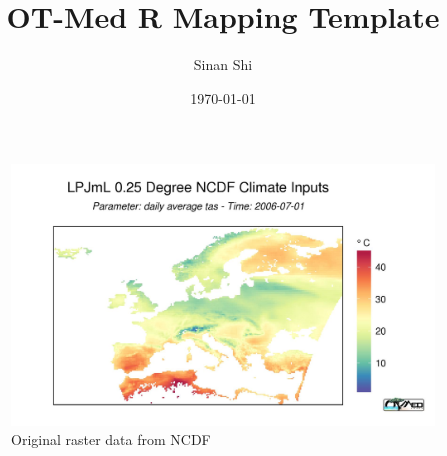 \documentclass[a4paper,10pt]{article}
\title{OT-Med R Mapping Template}
\author{Sinan Shi}
\date{\today}
\begin{document}
\maketitle
\listoffigures






\begin{figure}
  \centering
    \includegraphics[width=1.2\textwidth]{origin}
  \caption{Original raster data from NCDF}
\end{figure}
\end{document}
